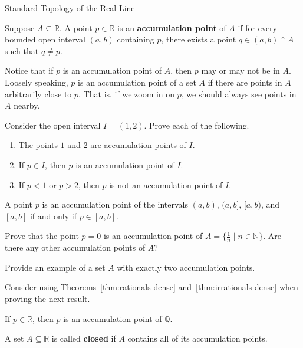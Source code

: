 \begin{section}{Standard Topology of the Real Line}
\begin{definition}
Suppose $A\subseteq \mathbb{R}$. A point $p\in \mathbb{R}$ is an \textbf{accumulation point} of $A$ if for every bounded open interval $(a,b)$ containing $p$, there exists a point $q \in (a,b)\cap A$ such that $q\neq p$.
\end{definition}

Notice that if $p$ is an accumulation point of $A$, then $p$ may or may not be in $A$. Loosely speaking, $p$ is an accumulation point of a set $A$ if there are points in $A$ arbitrarily close to $p$. That is, if we zoom in on $p$, we should always see points in $A$ nearby.

\begin{problem}
Consider the open interval $I=(1,2)$. Prove each of the following.
\begin{enumerate}[label=\textrm{(\alph*)}]
\item The points $1$ and $2$ are accumulation points of $I$.
\item If $p\in I$, then $p$ is an accumulation point of $I$.
\item If $p<1$ or $p>2$, then $p$ is not an accumulation point of $I$.
\end{enumerate}
\end{problem}

\begin{theorem}
A point $p$ is an accumulation point of the intervals $(a,b)$, $(a,b]$, $[a,b)$, and $[a,b]$ if and only if $p\in [a,b]$.
\end{theorem}

\begin{problem}
Prove that the point $p=0$ is an accumulation point of $A=\{\frac{1}{n}\mid n \in \mathbb{N}\}$.  Are there any other accumulation points of $A$? 
\end{problem}

\begin{problem}
Provide an example of a set $A$ with exactly two accumulation points.
\end{problem}

Consider using Theorems~\ref{thm:rationals dense} and~\ref{thm:irrationals dense} when proving the next result.

\begin{theorem}
If $p\in\mathbb{R}$, then $p$ is an accumulation point of $\mathbb{Q}$.
\end{theorem}

\begin{definition}
A set $A\subseteq \mathbb{R}$ is called \textbf{closed} if $A$ contains all of its accumulation points.
\end{definition}


\end{section}
